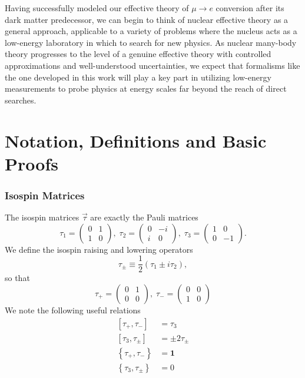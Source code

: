 \documentclass{book}[letterpaper,12pt]
\begin{document}
Having successfully modeled our effective theory of $\mu\rightarrow e$ conversion after its dark matter predecessor, we can begin to think of nuclear effective theory as a general approach, applicable to a variety of problems where the nucleus acts as a low-energy laboratory in which to search for new physics. As nuclear many-body theory progresses to the level of a genuine effective theory with controlled approximations and well-understood uncertainties, we expect that formalisms like the one developed in this work will play a key part in utilizing low-energy measurements to probe physics at energy scales far beyond the reach of direct searches.

%
%
\printbibliography

\appendix
\chapter{Notation, Definitions and Basic Proofs}
\thispagestyle{headings}
\subsection{Isospin Matrices}
The isospin matrices $\vec{\tau}$ are exactly the Pauli matrices
\begin{equation}
\tau_1=\left(\begin{array}{cc}
0 & 1\\
1 & 0
\end{array}\right),\;
\tau_2=\left(\begin{array}{cc}
0 & -i\\
i & 0
\end{array}\right),\;
\tau_3=\left(\begin{array}{cc}
1 & 0\\
0 & -1
\end{array}\right).
\end{equation}
We define the isospin raising and lowering operators
\begin{equation}
\tau_{\pm}\equiv \frac{1}{2}\left(\tau_1\pm i \tau_2\right),
\end{equation}
so that
\begin{equation}
\tau_+=\left(\begin{array}{cc}
0 & 1\\
0 & 0
\end{array}\right),\;\tau_- = \left(\begin{array}{cc}
0 & 0\\
1 & 0
\end{array}\right)
\end{equation}
We note the following useful relations
\begin{equation}
\begin{split}
\left[\tau_+,\tau_-\right]&=\tau_3\\
\left[\tau_3,\tau_{\pm}\right]&=\pm 2\tau_{\pm}\\
\left\{\tau_+,\tau_-\right\}&=\mathbf{1}\\
\left\{\tau_3,\tau_{\pm}\right\}&=0
\end{split}
\end{equation}
\end{document}
